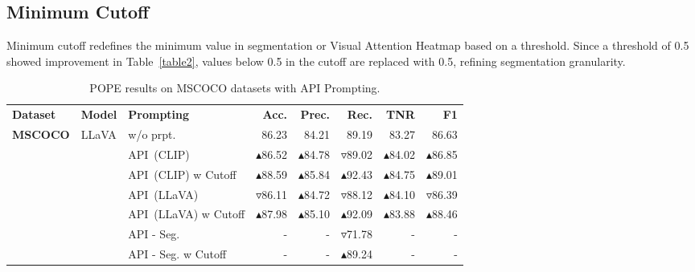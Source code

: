 \subsection{Minimum Cutoff}
Minimum cutoff redefines the minimum value in segmentation or Visual Attention Heatmap based on a threshold. Since a threshold of 0.5 showed improvement in Table~\ref{table2}, values below 0.5 in the cutoff are replaced with 0.5, refining segmentation granularity.

\begin{table*}[t]
\centering
\begin{tabular}{lllrrrrr}
\toprule
\textbf{Dataset} & \textbf{Model} & \textbf{Prompting} & \textbf{Acc.} & \textbf{Prec.} & \textbf{Rec.} & \textbf{TNR} & \textbf{F1} %
\\ \cmidrule(lr){1-8}
\multirow{7}{*}{\textbf{MSCOCO}} & \multirow{7}{*}{LLaVA} & w/o prpt. & 86.23 & 84.21  & 89.19 & 83.27 & 86.63 \\ %
& & API~(CLIP) & \ensuremath{\blacktriangle}86.52 & \ensuremath{\blacktriangle}84.78 & \ensuremath{\triangledown}89.02 & \ensuremath{\blacktriangle}84.02 & \ensuremath{\blacktriangle}86.85 \\ %
& & API~(CLIP) w Cutoff & \ensuremath{\blacktriangle}88.59 & \ensuremath{\blacktriangle}85.84 & \ensuremath{\blacktriangle}92.43 & \ensuremath{\blacktriangle}84.75 & \ensuremath{\blacktriangle}89.01 \\
 & & API~(LLaVA) & \ensuremath{\triangledown}86.11 & \ensuremath{\blacktriangle}84.72 & \ensuremath{\triangledown}88.12 & \ensuremath{\blacktriangle}84.10 & \ensuremath{\triangledown}86.39 \\ %
 & & API~(LLaVA) w Cutoff & \ensuremath{\blacktriangle}87.98 & \ensuremath{\blacktriangle}85.10 & \ensuremath{\blacktriangle}92.09 & \ensuremath{\blacktriangle}83.88 & \ensuremath{\blacktriangle}88.46 \\
  & & API - Seg. & - & - & \ensuremath{\triangledown}71.78 & - &  - \\ %
  & & API - Seg. w Cutoff & - & - & \ensuremath{\blacktriangle}89.24 & - &  - \\ %
 \bottomrule
\end{tabular}
\caption{POPE results on MSCOCO datasets with API Prompting.}
\label{table1}
\end{table*}

